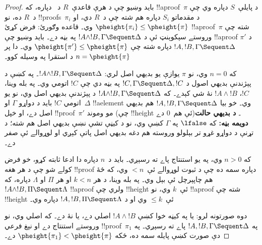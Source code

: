 \documentclass[../../../include/open-logic-section]{subfiles}
\begin{document}
\begin{proof}
بايد وښيو چې د هرې قاعدې~$R$ د~ دپاره، که
!!a{proof}~$\pi$ د پايلې~$S$ دپاره وي چې د~$R$ ده، نو
!!{proof}s~$\pi_i$ د مقدماتو $S_i$ دپاره هم شته چې د~$R$ دي،
او $\pheight{\pi_i}
\le \pheight{\pi}$ وي۔ قاعده \LeftR{\land} وګورئ: فرض کړئ
!!a{proof}~$\pi$ شته چې وروستے سېکوېنټ ئې د $!A \land !B, \Gamma
\Sequent \Delta$ په بڼه دے۔ بايد وښيو چې !!a{proof} $\pi'$
د $!A, !B, \Gamma \Sequent \Delta$ دپاره شته چې $\pheight{\pi'} \le
\pheight{\pi}$ وي۔ دا پر $n = \pheight{\pi}$ د استقرا په وسيله کوو۔

که $n = 0$ وي، نو $\pi$ يوازې يو بديهي اصل لري: $!A \land !B, \Gamma
\Sequent \Delta$۔ په  کښې د پېژندنې بديهي اصول د $!C, \Gamma
\Sequent \Delta, !C$ په بڼه دي چې $!C$ اتومي وي۔ په بله وينا،
$!C$، $!A \land !B$ نۀ شي کېدے۔ که $!A \land !B, \Gamma \Sequent \Delta$
د پېژندنې بديهي اصل وي، نو يو اتومي $!C$ بايد د دواړو $\Gamma$
او~$\Delta$ !!a{element} وي۔ خو بيا $!A, !B, \Gamma \Sequent \Delta$
هم بديهي اصل دے، او خپل !!{proof}~$\pi'$ مو وموند
(چې !!{height} ئې هم~$0$ دے)۔
\textbf{د بديهي حالت دويمه بڼه:} که $\lfalse$ په $\Gamma$ کښې وي، نو د کيڼې تشې نښې بديهي اصل هم شته؛ د تړنې د دواړو غړو تر بېلولو وروسته هم دغه بديهي اصل پاتې کېږي او لوړوالے ئې صفر دے۔

که $n>0$ وي، په يو استنتاج پاے ته رسېږي۔ بايد د~$n$ دپاره
دا ادعا ثابته کړو، خو فرض کولے شو چې د هر هغه !!{proof}
دپاره سمه ده چې د ثبوت لوړوالے ئې~$<n$ وي، که څۀ هم
چاپېرچل ئې بېل وي۔ په بله وينا، د هر $k<n$ او هر
$\Pi$ او $\Lambda$ دپاره، که $!A \land !B, \Pi \Sequent \Lambda$
!!a{proof} ولري چې !!{height} ئې~$k$ وي، نو !!a{proof} شته
چې !!{height} ئې~$\le k$ وي او د $!A, !B, \Pi \Sequent \Lambda$ دپاره وي۔

دوه صورتونه لرو: يا په کيڼه خوا کښې $!A \land
!B$ اصلي دے، يا نۀ دے۔ که اصلي وي، نو وروستے استنتاج
\LeftR{\land} دے او نېغ فرعي !!{proof}~$\pi_1$ په
$!A, !B, \Gamma \Sequent \Delta$ پاے ته رسېږي۔ په دې صورت
کښې پايله سمه ده، ځکه $\pheight{\pi_1} < \pheight{\pi}$ دے۔


\end{proof}
\end{document}
